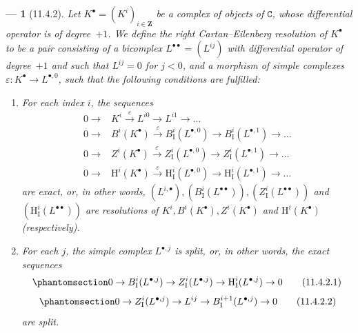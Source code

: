 \documentclass[oneside]{amsart}
\theoremstyle{ega-env-style}
\newtheorem*{env}{---}
\theoremstyle{ega-thm-env-style}
\theoremstyle{ega-defn-env-style}
\def\bb{\mathbf}                    %
\def\cat{\mathtt}                   %
\def\HH{\mathrm{H}}                 %
\newcommand{\oldpage}[2][]{{\marginnote{\normalfont{\textbf{#1}~|~#2}}}\ignorespaces}
\let\EGAOriginalLabel\label
\renewcommand{\label}[1]{\phantomsection\EGAOriginalLabel{#1}}
\begin{document}
\begin{env}[11.4.2]
\label{0.11.4.2}
Let $K^\bullet = (K^i)_{i\in\bb{Z}}$ be a complex of objects of $\cat{C}$, whose differential operator is of degree~$+1$.
We define the \emph{right Cartan--Eilenberg resolution} of $K^\bullet$ to be a pair consisting of a bicomplex $L^{\bullet\bullet} = (L^{ij})$ with differential operator of degree~$+1$ and such that $L^{ij}=0$ for $j<0$, and a morphism of simple complexes $\varepsilon: K^\bullet \rightarrow L^{\bullet, 0}$, such that the following conditions are fulfilled:
\oldpage[0\textsubscript{III}]{33}
\begin{enumerate}
  \item[(i)] For each index $i$, the sequences
    \[
      \begin{aligned}
        0 \rightarrow
        & K^i
        \xrightarrow{\varepsilon} L^{i0}
        \rightarrow L^{i1}
        \rightarrow \ldots
      \\0 \rightarrow
        & B^i(K^\bullet)
        \xrightarrow{\varepsilon} B_\mathrm{I}^i(L^{\bullet,0})
        \rightarrow B_\mathrm{I}^i(L^{\bullet,1})
        \rightarrow \ldots
      \\0 \rightarrow
        & Z^i(K^\bullet)
        \xrightarrow{\varepsilon} Z_\mathrm{I}^i(L^{\bullet,0})
        \rightarrow Z_\mathrm{I}^i(L^{\bullet,1})
        \rightarrow \ldots
      \\0 \rightarrow
        & \HH^i(K^\bullet)
        \xrightarrow{\varepsilon} \HH_\mathrm{I}^i(L^{\bullet,0})
        \rightarrow \HH_\mathrm{I}^i(L^{\bullet,1})
        \rightarrow \ldots
      \end{aligned}
    \]
    are exact, or, in other words, $(L^{i,\bullet}), (B_\mathrm{I}^i(L^{\bullet\bullet})), (Z_\mathrm{I}^i(L^{\bullet\bullet}))$ and $(\HH_\mathrm{I}^i(L^{\bullet\bullet}))$ are \emph{resolutions} of $K^i, B^i(K^\bullet), Z^i(K^\bullet)$ and $\HH^i(K^\bullet)$ (respectively).
  \item[(ii)] For each $j$, the simple complex $L^{\bullet, j}$ is \emph{split}, or, in other words, the exact sequences
    \[
      \label{0.11.4.2.1}
      0 \rightarrow B_\mathrm{I}^i(L^{\bullet,j}) \rightarrow Z_\mathrm{I}^i(L^{\bullet,j}) \rightarrow \HH_\mathrm{I}^i(L^{\bullet,j}) \rightarrow 0
      \tag{11.4.2.1}
    \]
    \[
      \label{0.11.4.2.2}
      0 \rightarrow Z_\mathrm{I}^i(L^{\bullet,j}) \rightarrow L^{ij} \rightarrow B_\mathrm{I}^{i+1}(L^{\bullet,j}) \rightarrow 0
      \tag{11.4.2.2}
    \]
    are \emph{split}.
\end{enumerate}


\end{env}
\end{document}

